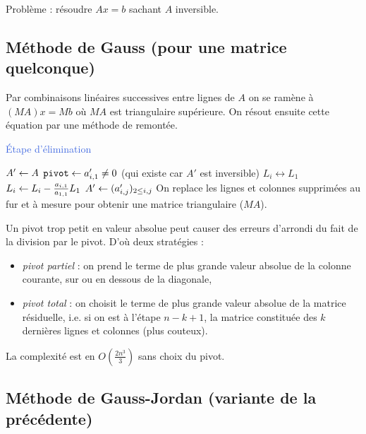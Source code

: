 Problème : résoudre $Ax = b$ sachant $A$ inversible.

\subsection{Méthode de Gauss (pour une matrice quelconque)}

	Par combinaisons linéaires successives entre lignes de $A$ on se ramène à $(MA)x = Mb$ où $MA$ est triangulaire supérieure.
	On résout ensuite cette équation par une méthode de remontée.
	
	\begin{algorithm}[h]
	\caption{\textcolor{RoyalBlue}{Étape d'élimination}}
	$A' \leftarrow A$ \;
	{
		$\texttt{pivot} \leftarrow a'_{i,1} \neq 0$ (qui existe car $A'$ est inversible) \;
		{
			$L_i \leftrightarrow L_1$ \;
		}
		{
			$L_i \leftarrow L_i - \frac{a_{i,1}}{a_{1,1}} L_1$ \;
		}
		$A' \leftarrow (a'_{i,j})_{2 \leq i,j}$
	}
	On replace les lignes et colonnes supprimées au fur et à mesure pour obtenir une matrice triangulaire ($MA$).
	\end{algorithm}

	Un pivot trop petit en valeur absolue peut causer des erreurs d'arrondi du fait de la division par le pivot.
	D'où deux stratégies :
	\begin{itemize}
	\item[\textbullet] \textit{pivot partiel} : on prend le terme de plus grande valeur absolue de la colonne courante, sur ou en dessous de la diagonale,
	\item[\textbullet] \textit{pivot total} : on choisit le terme de plus grande valeur absolue de la matrice résiduelle, i.e. si on est à l'étape $n - k + 1$, la matrice constituée des $k$ dernières lignes et colonnes (plus couteux).
	\end{itemize}
	
	La complexité est en $O \left( \frac{2n^3}{3} \right)$ sans choix du pivot.

\subsection{Méthode de Gauss-Jordan (variante de la précédente)}

